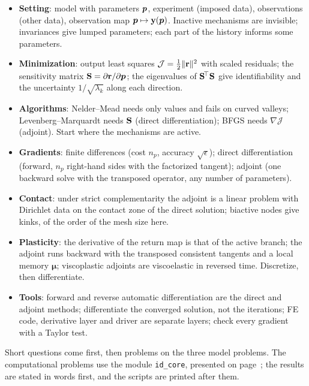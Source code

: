 \begin{gbox*}
\begin{itemize}
  \item \textbf{Setting}: model with parameters $\bm{p}$, experiment (imposed
  data), observations (other data), observation map $\bm{p}\mapsto\mathbf{y}(\bm{p})$.
  Inactive mechanisms are invisible; invariances give lumped parameters; each
  part of the history informs some parameters.
  \item \textbf{Minimization}: output least squares
  $\mathcal J=\tfrac12\lVert \mathbf{r}\rVert^2$ with scaled residuals; the sensitivity matrix
  $\mathbf{S}=\partial\mathbf{r}/\partial\bm{p}$; the eigenvalues of $\mathbf{S}^{\!\top}\mathbf{S}$ give
  identifiability and the uncertainty $1/\sqrt{\lambda_k}$ along each direction.
  \item \textbf{Algorithms}: Nelder--Mead needs only values and fails on curved
  valleys; Levenberg--Marquardt needs $\mathbf{S}$ (direct differentiation); BFGS
  needs $\nabla\mathcal J$ (adjoint). Start where the mechanisms are active.
  \item \textbf{Gradients}: finite differences (cost $n_p$, accuracy
  $\sqrt\epsilon$); direct differentiation (forward, $n_p$ right-hand sides with the
  factorized tangent); adjoint (one backward solve with the transposed
  operator, any number of parameters).
  \item \textbf{Contact}: under strict complementarity the adjoint is a linear
  problem with Dirichlet data on the contact zone of the direct solution; biactive
  nodes give kinks, of the order of the mesh size here.
  \item \textbf{Plasticity}: the derivative of the return map is that of the
  active branch; the adjoint runs backward with the transposed consistent
  tangents and a local memory $\boldsymbol\mu$; viscoplastic adjoints are viscoelastic
  in reversed time. Discretize, then differentiate.
  \item \textbf{Tools}: forward and reverse automatic differentiation are the direct
  and adjoint methods; differentiate the converged solution, not the iterations;
  FE code, derivative layer and driver are separate layers; check every gradient
  with a Taylor test.
\end{itemize}
\end{gbox*}

\label{sec:id-exo}
Short questions come first, then problems on the three model problems. The
computational problems use the module \texttt{id\_core}, presented on
page~\pageref{sec:id-aux}; the results are stated in words first, and the
scripts are printed after them.

